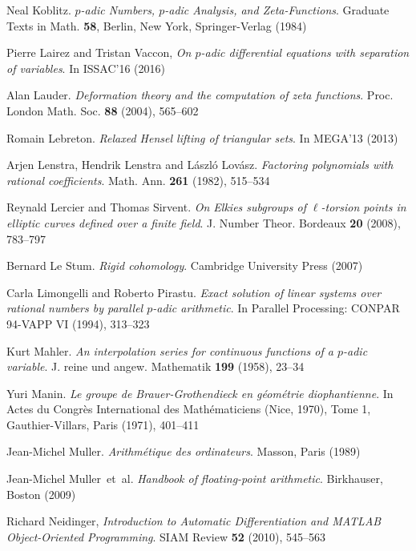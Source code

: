 \documentclass[11pt]{article}
\numberwithin{equation}{section}
\numberwithin{figure}{section}
\theoremstyle{definition}
\begin{document}
\begin{thebibliography}{99}
  Neal Koblitz.
  \emph{$p$-adic Numbers, $p$-adic Analysis, and Zeta-Functions}.
  Graduate Texts in Math. \textbf{58}, Berlin, New York, Springer-Verlag (1984)

  Pierre Lairez and Tristan Vaccon,
  \emph{On $p$-adic differential equations with separation of variables}.
  In ISSAC'16 (2016)

  Alan Lauder.
  \emph{Deformation theory and the computation of zeta functions}.
  {Proc. London Math. Soc.} \textbf{88} (2004), 565--602

  Romain Lebreton. 
  \emph{Relaxed Hensel lifting of triangular sets}. 
  In MEGA’13 (2013)

  Arjen Lenstra, Hendrik Lenstra and László Lovász.
  \emph{Factoring polynomials with rational coefficients}.
  Math. Ann. \textbf{261} (1982), 515--534

  Reynald Lercier and Thomas Sirvent.
  \emph{On Elkies subgroups of $\ell$-torsion points in elliptic curves
  defined over a finite field}.
  {J. Number Theor. Bordeaux} \textbf{20} (2008), 783--797

  Bernard Le Stum.
  \emph{Rigid cohomology}.
  Cambridge University Press (2007)

  Carla Limongelli and Roberto Pirastu. 
  \emph{Exact solution of linear systems over rational
  numbers by parallel $p$-adic arithmetic}. 
  In Parallel Processing: CONPAR 94-VAPP VI (1994), 313--323

  Kurt Mahler.
  \emph{An interpolation series for continuous functions of a $p$-adic variable}.
  J. reine und angew. Mathematik \textbf{199} (1958), 23--34

  Yuri Manin.
  \emph{Le groupe de Brauer-Grothendieck en géométrie diophantienne}.
  In Actes du Congrès International des Mathématiciens (Nice, 1970), Tome 1, 
  Gauthier-Villars, Paris (1971), 401--411

  Jean-Michel Muller.
  \emph{Arithmétique des ordinateurs}.
  Masson, Paris (1989)

  Jean-Michel Muller~et~al.
  \emph{Handbook of floating-point arithmetic}.
  Birkhauser, Boston (2009)

  Richard Neidinger,
  \emph{Introduction to Automatic Differentiation and MATLAB Object-Oriented Programming}.
  SIAM Review \textbf{52} (2010), 545--563


\end{thebibliography}
\end{document}

